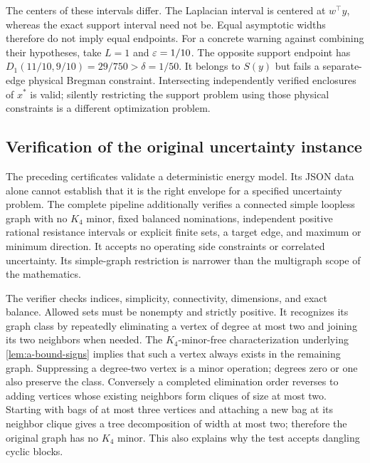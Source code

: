 The centers of these intervals differ. The Laplacian interval is
centered at $w^\top y$, whereas the exact support interval need not
be. Equal asymptotic widths therefore do not imply equal endpoints.
For a concrete warning against combining their hypotheses, take
$L=1$ and $\varepsilon=1/10$. The opposite support endpoint has
$D_1(11/10,9/10)=29/750>\delta=1/50$. It belongs to $S(y)$
but fails a separate-edge physical Bregman constraint. Intersecting
independently verified enclosures of $x^*$ is valid; silently
restricting the support problem using those physical constraints is
a different optimization problem.

\subsection{Verification of the original uncertainty instance}

The preceding certificates validate a deterministic energy model. Its
JSON data alone cannot establish that it is the right envelope for a
specified uncertainty problem. The complete pipeline additionally
verifies a connected simple loopless graph with no $K_4$ minor,
fixed balanced nominations, independent positive rational resistance
intervals or explicit finite sets, a target edge, and maximum or
minimum direction. It accepts no operating side constraints or
correlated uncertainty. Its simple-graph restriction is narrower than
the multigraph scope of the mathematics.

The verifier checks indices, simplicity, connectivity, dimensions, and
exact balance. Allowed sets must be nonempty and strictly positive. It recognizes
its graph class by repeatedly eliminating a vertex of degree at most
two and joining its two neighbors when needed. The $K_4$-minor-free
characterization underlying \cref{lem:a-bound-signs} implies that
such a vertex always exists in the remaining graph. Suppressing a
degree-two vertex is a minor operation; degrees zero or one also
preserve the class. Conversely a completed elimination order reverses
to adding vertices whose existing neighbors form cliques of size at
most two. Starting with bags of at most three vertices and attaching
a new bag at its neighbor clique gives a tree decomposition of width
at most two; therefore the original graph has no $K_4$ minor.
This also explains why the test accepts dangling cyclic blocks.

